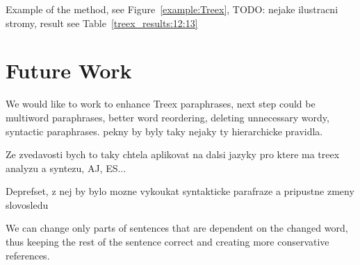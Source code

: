 \documentclass[11pt]{article}
\def\Tref#1{Table~\ref{#1}}
\def\Fref#1{Figure~\ref{#1}}
\begin{document}
Example of the method, see \Fref{example:Treex}, TODO: nejake ilustracni stromy, result see \Tref{treex_results:12:13}

\section{Future Work}
We would like to work to enhance Treex paraphrases, next step could be multiword 
paraphrases, better word reordering, deleting unnecessary wordy, syntactic paraphrases.
 pekny by byly
taky nejaky ty hierarchicke pravidla. 

Ze zvedavosti bych to taky chtela aplikovat na dalsi jazyky pro ktere ma treex
analyzu a syntezu, AJ, ES...

Deprefset, z nej by bylo mozne vykoukat syntakticke parafraze a pripustne zmeny slovosledu

We can change only parts of sentences that are dependent on the changed word, 
thus keeping the rest of the sentence correct and creating more conservative 
references.



\end{document}
